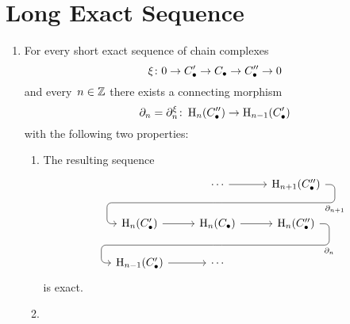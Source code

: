 \section{Long Exact Sequence}


\begin{theorem}
  \leavevmode
  \begin{enumerate}
    \item
      For every short exact sequence of chain complexes
      \[
        \xi
        \colon
        0
        \to
        C_\bullet'
        \to
        C_\bullet
        \to
        C_\bullet''
        \to
        0
      \]
      and every~$n \in \mathbb{Z}$ there exists a connecting morphism
      \[
        \partial_n
        =
        \partial_n^\xi
        \colon
        \operatorname{H}_n(C_\bullet'')
        \to
        \operatorname{H}_{n-1}(C_\bullet')
      \]
      with the following two properties:
      \begin{enumerate}
        \item
          The resulting sequence
          \[
            \begin{tikzcd}
                {}
              & \dotsb
                \arrow{r}
                \arrow[d, phantom, ""{coordinate, name=Y}]
              & \Hl_{n+1}(\Ccc'')
                \arrow[ dll,
                        "\del_{n+1}",
                        rounded corners,
                        to path={ -- ([xshift=2ex]\tikztostart.east)
                                  |- (Y) \tikztonodes
                                  -| ([xshift=-2ex]\tikztotarget.west)
                                  -- (\tikztotarget)}
                      ]
              \\
                \Hl_n(\Ccc')
                \arrow{r}
              & \Hl_n(\Ccc)
                \arrow{r}
                \arrow[d, phantom, ""{coordinate, name=Z}]
              & \Hl_n(\Ccc'')
                \arrow[ dll,
                        "\del_n",
                        rounded corners,
                        to path={ -- ([xshift=2ex]\tikztostart.east)
                                  |- (Z) \tikztonodes
                                  -| ([xshift=-2ex]\tikztotarget.west)
                                  -- (\tikztotarget)}
                      ]
              \\
                \Hl_{n-1}(\Ccc')
                \arrow{r}
              & \dotsb
              & {}
            \end{tikzcd}
          \]
          is exact.
        \item

\end{enumerate}
\end{enumerate}
\end{theorem}
